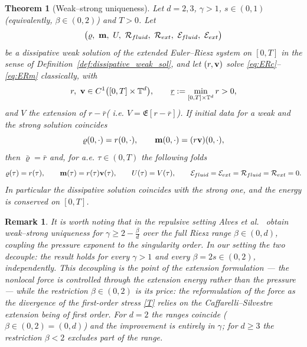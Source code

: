 \documentclass[12pt,a4paper,twoside]{article}
\newcommand{\Ov}[1]{\overline{#1}}
\newcommand{\vr}{\varrho}
\newcommand{\vv}{\vc{v}}
\newcommand{\vc}[1]{{\bf #1}}
\newtheorem{thm}{Theorem}
\newtheorem{rmk}{Remark}
\numberwithin{equation}{section}%
\newcommand{\vm}{\vc{m}}
\begin{document}
	\begin{thm}[Weak--strong uniqueness]\label{thm:ws}
		Let $d=2,3$, $\gamma>1$, $s\in(0,1)$ (equivalently, $\beta \in (0,2)$) and $T>0$. Let
		\[
		\big(\vr,\ \vm,\ U,\ \mathcal R_{fluid},\ \mathcal R_{ext},\ \mathcal E_{fluid},\ \mathcal E_{ext}\big)
		\]
		be a dissipative weak solution of the extended Euler--Riesz system on $[0,T]$ in the sense of Definition~\ref{def:dissipative_weak_sol}, and let $(r,\vv)$ solve \eqref{eq:ERc}--\eqref{eq:ERm} classically, with
		\begin{equation}\label{strong-class}
			r,\ \vv\in C^1\big([0,T]\times\mathbb T^d\big),
			\qquad
			\underline r:=\min_{[0,T]\times\mathbb T^d} r>0 ,
		\end{equation}
		and $V$ the extension of $r-\bar r$( i.e. $V= \mathfrak{E}[r-\Ov{r}]$). If initial data for a weak and the strong solution coincides 
		\[
		\vr(0,\cdot)=r(0,\cdot),\qquad \vm(0,\cdot)=(r\vv)(0,\cdot),
		\]
		then $\bar\vr=\bar r$ and, for a.e. $\tau \in (0,T)$ the following folds 
		\[
		\vr(\tau)=r(\tau),\qquad \vm(\tau)=r(\tau)\vv(\tau),\qquad U(\tau)=V(\tau),
		\qquad
		\mathcal E_{fluid}=\mathcal E_{ext}=\mathcal R_{fluid}=\mathcal R_{ext}=0.
		\]
		In particular the dissipative solution coincides with the strong one, and the energy is conserved on $[0,T]$.
	\end{thm}
	\begin{rmk}\label{compref}
		It is worth noting that in the repulsive setting Alves et al.~\cite{AlGT2026} obtain
		weak--strong uniqueness for $\gamma\ge 2-\tfrac{\beta}{d}$ over the full Riesz range
		$\beta\in(0,d)$, coupling the pressure exponent to the singularity order. In our setting the
		two decouple: the result holds for every $\gamma>1$ and every $\beta=2s\in(0,2)$,
		independently. This decoupling is the point of the extension formulation --- the nonlocal
		force is controlled through the extension energy rather than the pressure --- while the
		restriction $\beta\in(0,2)$ is its price: the reformulation of the force as the divergence of
		the first-order stress \eqref{T} relies on the Caffarelli--Silvestre extension being of first
		order. For $d=2$ the ranges coincide ($\beta\in(0,2)=(0,d)$) and the improvement is entirely
		in $\gamma$; for $d\ge3$ the restriction $\beta<2$ excludes part of the \cite{AlGT2026} range.
	\end{rmk}
\end{document}
